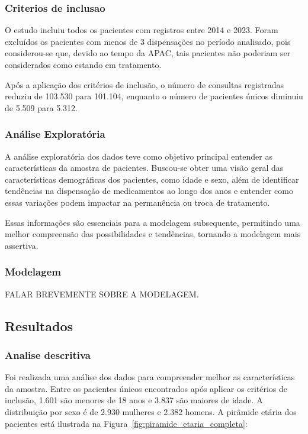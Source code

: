\documentclass[article,a4paper,12pt,brazil,sumario=tradicional]{abntex2}
\begin{document}
\subsubsection{Criterios de inclusao}

O estudo incluiu todos os pacientes com registros entre 2014 e 2023. Foram excluídos os pacientes com menos de 3 dispensações no período analisado, pois considerou-se que, devido ao tempo da APAC, tais pacientes não poderiam ser considerados como estando em tratamento.

Após a aplicação dos critérios de inclusão, o número de consultas registradas reduziu de 103.530 para 101.104, enquanto o número de pacientes únicos diminuiu de 5.509 para 5.312.

\subsubsection{Análise Exploratória}

A análise exploratória dos dados teve como objetivo principal entender as características da amostra de pacientes. Buscou-se obter uma visão geral das características demográficas dos pacientes, como idade e sexo, além de identificar tendências na dispensação de medicamentos ao longo dos anos e entender como essas variações podem impactar na permanência ou troca de tratamento.

Essas informações são essenciais para a modelagem subsequente, permitindo uma melhor compreensão das possibilidades e tendências, tornando a modelagem mais assertiva.

\subsubsection{Modelagem}

FALAR BREVEMENTE SOBRE A MODELAGEM.

\subsection{Resultados}

\subsubsection{Analise descritiva}

Foi realizada uma análise dos dados para compreender melhor as características da amostra. Entre os pacientes únicos encontrados após aplicar os critérios de inclusão, 1.601 são menores de 18 anos e 3.837 são maiores de idade. A distribuição por sexo é de 2.930 mulheres e 2.382 homens. A pirâmide etária dos pacientes está ilustrada na Figura~\ref{fig:piramide_etaria_completa}:
\end{document}
